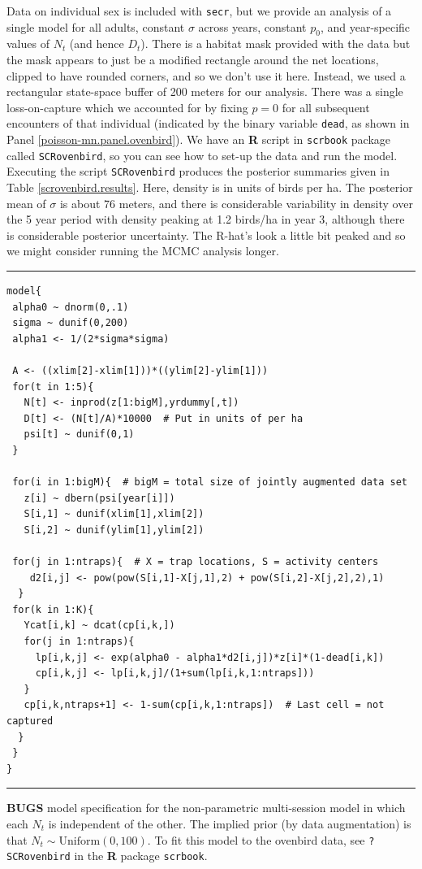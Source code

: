 Data on individual sex is included
with \mbox{\tt secr}, but  we provide an analysis of a single model
for all adults, constant $\sigma$ across years, constant $p_{0}$, and
year-specific values of $N_{t}$ (and hence $D_{t}$).
 There is a habitat mask provided with the data but the mask
appears to just be a modified rectangle around the net locations,
clipped to have rounded corners, and so we don't use it here.
Instead, we used a rectangular state-space buffer of 200 meters for our analysis.
There was a
single loss-on-capture which we accounted for by fixing $p=0$ for all
subsequent encounters of that individual (indicated by the binary
variable \mbox{\tt dead}, as shown in Panel
\ref{poisson-mn.panel.ovenbird}).  
We have an {\bf R} script in
\mbox{\tt scrbook} package called \mbox{\tt SCRovenbird}, so you can
see how to set-up the data and run the model.  Executing the script
\mbox{\tt SCRovenbird} produces the posterior summaries given in Table
\ref{scrovenbird.results}. Here, density is in units of birds per
ha. The posterior mean of $\sigma$ is about 76 meters, and there is
considerable variability in density over the 5 year period with
density peaking  at 1.2 birds/ha in year 3, although there is
considerable posterior uncertainty.  The R-hat's look a little bit
peaked and so we might consider running the MCMC analysis longer.



\begin{panel}[htp]
\centering
\rule[0.15in]{\textwidth}{.03in}
{\small
\begin{verbatim}
model{
 alpha0 ~ dnorm(0,.1)
 sigma ~ dunif(0,200)
 alpha1 <- 1/(2*sigma*sigma)

 A <- ((xlim[2]-xlim[1]))*((ylim[2]-ylim[1]))
 for(t in 1:5){
   N[t] <- inprod(z[1:bigM],yrdummy[,t])
   D[t] <- (N[t]/A)*10000  # Put in units of per ha
   psi[t] ~ dunif(0,1)
 }

 for(i in 1:bigM){  # bigM = total size of jointly augmented data set
   z[i] ~ dbern(psi[year[i]])
   S[i,1] ~ dunif(xlim[1],xlim[2])
   S[i,2] ~ dunif(ylim[1],ylim[2])

 for(j in 1:ntraps){  # X = trap locations, S = activity centers
    d2[i,j] <- pow(pow(S[i,1]-X[j,1],2) + pow(S[i,2]-X[j,2],2),1)
  }
 for(k in 1:K){
   Ycat[i,k] ~ dcat(cp[i,k,])
   for(j in 1:ntraps){
     lp[i,k,j] <- exp(alpha0 - alpha1*d2[i,j])*z[i]*(1-dead[i,k])
     cp[i,k,j] <- lp[i,k,j]/(1+sum(lp[i,k,1:ntraps]))
   }
   cp[i,k,ntraps+1] <- 1-sum(cp[i,k,1:ntraps])  # Last cell = not captured
  } 
 }  
}
\end{verbatim}
}
\rule[-0.15in]{\textwidth}{.03in}
\caption{
{\bf BUGS} model specification for the non-parametric multi-session
model in which each $N_{t}$ is independent of the other. The implied
prior (by data augmentation) is that $N_{t} \sim
\mbox{Uniform}(0,100)$.
To fit this model to the ovenbird data, see
 \mbox{\tt ?SCRovenbird} in the {\bf R} package \mbox{\tt scrbook}.
}
\label{poisson-mn.panel.ovenbird}
\end{panel}


